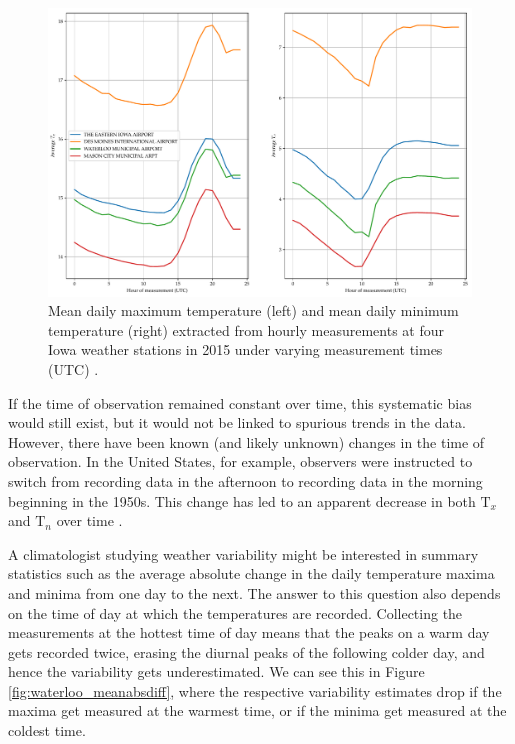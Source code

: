 \documentclass[letter]{article}
\makeatletter
\def\maxwidth{\ifdim\Gin@nat@width>\linewidth\linewidth
\else\Gin@nat@width\fi}
\let\Oldincludegraphics\includegraphics
\renewcommand{\includegraphics}[1]{\Oldincludegraphics[width=0.98\maxwidth]{#1}}
\newcommand{\T}{\mathrm{T}}
\newcommand{\Tn}{\T_{n}}
\newcommand{\Tx}{\T_{x}}
\makeatother
\begin{document}
\begin{figure}
\centering
\includegraphics{../figures/waterloo_avgTnTx.pdf}
\caption{\label{fig:waterloo_avgTnTx}
Mean daily maximum temperature (left)
and mean daily minimum temperature (right)
extracted from hourly measurements at four Iowa weather stations in 2015
under varying measurement times (UTC)
.}
\end{figure}
    



If the time of observation remained constant over time, this systematic bias would still exist, but it would not be linked to spurious trends in the data. However, there have been known (and likely unknown) changes in the time of observation.
In the United States, for example, observers were instructed to switch from recording data in the afternoon to recording data in the morning beginning in the 1950s.
This change has led to an apparent decrease in both $\Tx$ and $\Tn$ over time \citep{menne2009us}. 
    

        A climatologist studying weather variability might be interested in summary statistics such as the average absolute change in the daily temperature maxima and minima from one day to the next.
The answer to this question also depends on the time of day at which the temperatures are recorded.
Collecting the measurements at the hottest time of day means that the peaks on a warm day gets recorded twice,
erasing the diurnal peaks of the following colder day,
and hence the variability gets underestimated.
We can see this in Figure \ref{fig:waterloo_meanabsdiff}, where the respective variability estimates drop if the maxima get measured at the warmest time, or if the minima get measured at the coldest time.
\end{document}
